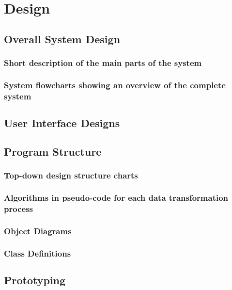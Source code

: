\chapter{Design}

\section{Overall System Design}

\subsection{Short description of the main parts of the system}

\subsection{System flowcharts showing an overview of the complete system}

\section{User Interface Designs}

\section{Program Structure}

\subsection{Top-down design structure charts}

\subsection{Algorithms in pseudo-code for each data transformation process}

\subsection{Object Diagrams}

\subsection{Class Definitions}

\newpage

\section{Prototyping}

